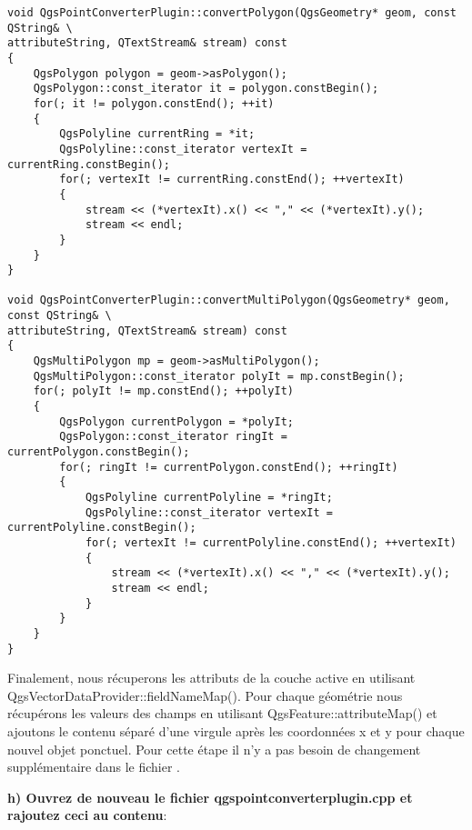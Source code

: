 \begin{verbatim}
void QgsPointConverterPlugin::convertPolygon(QgsGeometry* geom, const QString& \
attributeString, QTextStream& stream) const
{
    QgsPolygon polygon = geom->asPolygon();
    QgsPolygon::const_iterator it = polygon.constBegin();
    for(; it != polygon.constEnd(); ++it)
    {
        QgsPolyline currentRing = *it;
        QgsPolyline::const_iterator vertexIt = currentRing.constBegin();
        for(; vertexIt != currentRing.constEnd(); ++vertexIt)
        {
            stream << (*vertexIt).x() << "," << (*vertexIt).y();
            stream << endl;
        }
    }
}

void QgsPointConverterPlugin::convertMultiPolygon(QgsGeometry* geom, const QString& \
attributeString, QTextStream& stream) const
{
    QgsMultiPolygon mp = geom->asMultiPolygon();
    QgsMultiPolygon::const_iterator polyIt = mp.constBegin();
    for(; polyIt != mp.constEnd(); ++polyIt)
    {
        QgsPolygon currentPolygon = *polyIt;
        QgsPolygon::const_iterator ringIt = currentPolygon.constBegin();
        for(; ringIt != currentPolygon.constEnd(); ++ringIt)
        {
            QgsPolyline currentPolyline = *ringIt;
            QgsPolyline::const_iterator vertexIt = currentPolyline.constBegin();
            for(; vertexIt != currentPolyline.constEnd(); ++vertexIt)
            {
                stream << (*vertexIt).x() << "," << (*vertexIt).y();
                stream << endl;
            }
        }
    }
}
\end{verbatim}


Finalement, nous récuperons les attributs de la couche active en utilisant 
QgsVectorDataProvider::fieldNameMap(). Pour chaque géométrie nous récupérons les 
valeurs des champs en utilisant QgsFeature::attributeMap() et ajoutons le 
contenu séparé d'une virgule après les coordonnées x et y pour chaque nouvel 
objet ponctuel. Pour cette étape il n'y a pas besoin de changement supplémentaire
 dans le fichier \filename{qgspointconverterplugin.h}.

\textbf{h) Ouvrez de nouveau le fichier qgspointconverterplugin.cpp et rajoutez 
ceci au contenu}:

